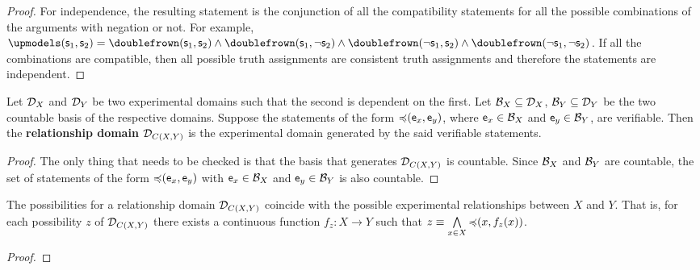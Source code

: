 \documentclass[11pt,letterpaper,fleqn]{memoir} %
\begin{document}
\begin{mathSection}
\begin{proof}
		For independence, the resulting statement is the conjunction of all the compatibility statements for all the possible combinations of the arguments with negation or not. For example, $\mathbin{\indep}(\stmt_1, \stmt_2) = \mathbin{\comp}(\stmt_1, \stmt_2)\AND\mathbin{\comp}(\stmt_1, \NOT \stmt_2)\AND\mathbin{\comp}(\NOT\stmt_1, \stmt_2)\AND\mathbin{\comp}(\NOT\stmt_1, \NOT\stmt_2)$. If all the combinations are compatible, then all possible truth assignments are consistent truth assignments and therefore the statements are independent.
	\end{proof}
	\begin{defn}
		Let $\edomain_X$ and $\edomain_Y$ be two experimental domains such that the second is dependent on the first. Let $\basis_X \subseteq \edomain_X$,  $\basis_Y \subseteq \edomain_Y$ be the two countable basis of the respective domains. Suppose the statements of the form
		$\mathbin{\narrower}(\obs[e]_x, \obs[e]_y)$, where $\obs[e]_x \in \basis_X$ and $ \obs[e]_y \in \basis_Y$, are verifiable. Then the \textbf{relationship domain} $\edomain_{C(X,Y)}$ is the experimental domain generated by the said verifiable statements.
	\end{defn}
	\begin{proof}
		The only thing that needs to be checked is that the basis that generates $\edomain_{C(X,Y)}$ is countable. Since $\basis_X$ and $\basis_Y$ are countable, the set of statements of the form $\mathbin{\narrower}(\obs[e]_x, \obs[e]_y)$ with $\obs[e]_x \in \basis_X$ and $ \obs[e]_y \in \basis_Y$ is also countable.
	\end{proof}
\begin{prop}
	The possibilities for a relationship domain $\edomain_{C(X,Y)}$ coincide with the possible experimental relationships between $X$ and $Y$. That is, for each possibility $z$ of $\edomain_{C(X,Y)}$ there exists a continuous function $f_z : X \to Y$ such that $z\equiv\bigAND\limits_{x\in X} \mathbin{\narrower}(x, f_z(x))$.
\end{prop}
\begin{proof}

\end{proof}
\end{mathSection}
\end{document}
